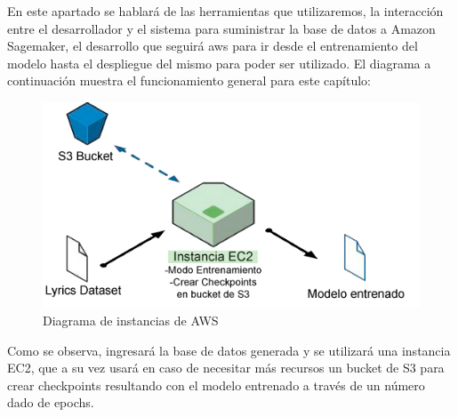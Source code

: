 \documentclass[12pt, a4paper, titlepage]{report}
\begin{document}
	En este apartado se hablará de las herramientas que utilizaremos, la interacción entre el desarrollador y el sistema para suministrar la base de datos a Amazon Sagemaker, el desarrollo que seguirá \acrshort{aws} para ir desde el entrenamiento del modelo hasta el despliegue del mismo para poder ser utilizado.
	El diagrama a continuación muestra el funcionamiento general para este capítulo:
	\begin{figure}[H] 
		\includegraphics[scale=.75]{./imagenes/Disenio/Arquitectura/Instancias.png}
		\caption{Diagrama de instancias de AWS}
	\end{figure}
	Como se observa, ingresará la base de datos generada y se utilizará una instancia EC2, que a su vez usará en caso de necesitar más recursos un bucket de S3 para crear checkpoints resultando con el modelo entrenado a través de un número dado de epochs.
\end{document}
